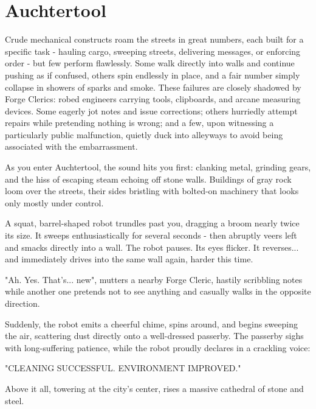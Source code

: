 \chapter*{Auchtertool}

{\entryfont Crude mechanical constructs roam the streets in great numbers, each built for a specific task - hauling cargo, sweeping streets, delivering messages, or enforcing order - but few perform flawlessly. Some walk directly into walls and continue pushing as if confused, others spin endlessly in place, and a fair number simply collapse in showers of sparks and smoke. These failures are closely shadowed by Forge Clerics: robed engineers carrying tools, clipboards, and arcane measuring devices. Some eagerly jot notes and issue corrections; others hurriedly attempt repairs while pretending nothing is wrong; and a few, upon witnessing a particularly public malfunction, quietly duck into alleyways to avoid being associated with the embarrassment.}

\begin{DndReadAloud}
	As you enter Auchtertool, the sound hits you first: clanking metal, grinding gears, and the hiss of escaping steam echoing off stone walls. Buildings of gray rock loom over the streets, their sides bristling with bolted-on machinery that looks only mostly under control.

	A squat, barrel-shaped robot trundles past you, dragging a broom nearly twice its size. It sweeps enthusiastically for several seconds - then abruptly veers left and smacks directly into a wall. The robot pauses. Its eyes flicker. It reverses... and immediately drives into the same wall again, harder this time.

	"Ah. Yes. That's... new", mutters a nearby Forge Cleric, hastily scribbling notes while another one pretends not to see anything and casually walks in the opposite direction.

	Suddenly, the robot emits a cheerful chime, spins around, and begins sweeping the air, scattering dust directly onto a well-dressed passerby. The passerby sighs with long-suffering patience, while the robot proudly declares in a crackling voice:
	
	"CLEANING SUCCESSFUL. ENVIRONMENT IMPROVED."

	Above it all, towering at the city's center, rises a massive cathedral of stone and steel.
\end{DndReadAloud}
\vfill\eject
